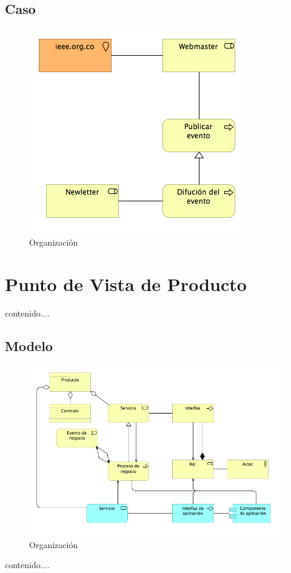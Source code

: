\subsection{Caso}
\begin{figure}[th!]
	\centering
	\includegraphics[width=0.8\linewidth]{arquitectura_diseno/imgs/C_CoperacionProceso}
	\caption{Organización}
\end{figure}
\newpage
\section{Punto de Vista de Producto}
contenido....
\subsection{Modelo}
\begin{figure}[th!]
	\centering
	\includegraphics[width=0.8\linewidth]{arquitectura_diseno/imgs/M_Producto}
	\caption{Organización}
\end{figure}
\newpage
contenido....
